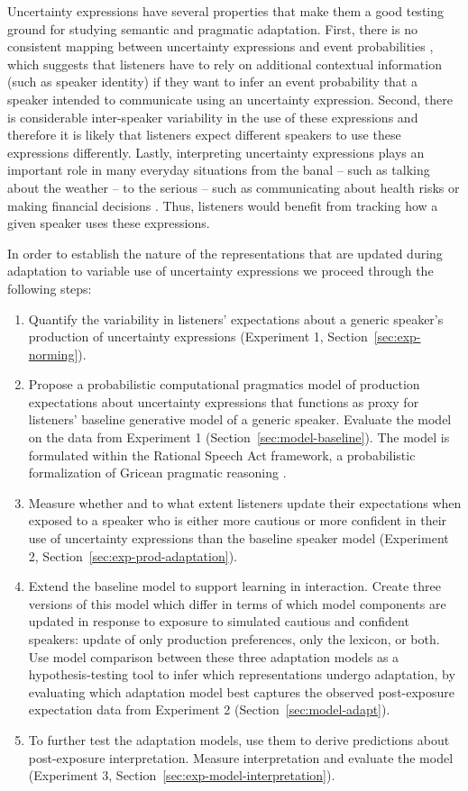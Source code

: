\documentclass[man, floatsintext]{apa6}
\newcommand{\sectionref}[1]{Section~\ref{#1}}
\begin{document}
Uncertainty expressions have several properties that make them a good testing ground for studying semantic and pragmatic
adaptation. First, there is no consistent mapping between uncertainty expressions and event probabilities \parencite[e.g.,][]{Clark1990,Pepper1974}, which suggests that listeners have to rely on additional contextual information (such as speaker identity)
if they want to infer an event probability that a speaker intended to communicate using an uncertainty expression. Second, there is considerable inter-speaker variability 
in the use of these expressions \parencite{Wallsten1986} and therefore it is likely that listeners expect different speakers to use these expressions
differently. Lastly, interpreting uncertainty expressions plays an important role in many everyday situations from the banal -- such as talking about the weather -- to the serious -- such as communicating about health risks \parencite{Berry2004, Lipkus2007, Politi2007} or making financial decisions \parencite{Doupnik2003}. 
Thus, listeners would benefit from tracking  how a given speaker uses these expressions. 

In order to establish the nature of the representations that are updated during adaptation to variable use of uncertainty expressions we proceed through the following steps:
\begin{enumerate}
	\item Quantify the variability in listeners' expectations about a generic speaker's production of uncertainty expressions (Experiment 1, \sectionref{sec:exp-norming}).
	\item Propose a probabilistic computational pragmatics model of production expectations about uncertainty expressions that functions as proxy for listeners' baseline generative model of a generic speaker. Evaluate the model on the data from Experiment 1 (\sectionref{sec:model-baseline}). The model is formulated within the Rational Speech Act framework, a probabilistic formalization of Gricean pragmatic reasoning   \parencite{Frank2012,Goodman2016,Franke2016}.
	\item Measure whether and to what extent listeners update their expectations when exposed to a speaker who is either more cautious or more confident in their use of uncertainty expressions than the baseline speaker model (Experiment 2, \sectionref{sec:exp-prod-adaptation}).
	\item Extend the baseline model to support learning in interaction. Create three versions of this model which differ in terms of which model components are updated in response to exposure to simulated cautious and confident speakers: update of only production preferences, only the lexicon, or both. Use model comparison between these three adaptation models as a hypothesis-testing tool to infer which representations undergo adaptation, by evaluating which adaptation model best captures the observed post-exposure expectation data from Experiment 2 (\sectionref{sec:model-adapt}).
	\item To further test the adaptation models, use them to derive predictions about post-exposure interpretation. Measure interpretation and evaluate the model (Experiment 3, \sectionref{sec:exp-model-interpretation}).
\end{enumerate}
\end{document}
